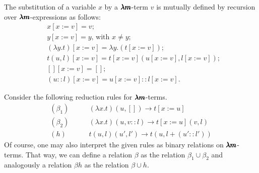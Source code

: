 \begin{definition}
  The substitution of a variable $x$ by a $\pmb{\lambda m}$-term $v$ is mutually defined by recursion over $\pmb{\lambda m}$-expressions as follows:  
  \begin{align*}
  & x[x := v] = v ; \\
  & y[x := v] = y \text{, with } x \neq y ; \\
  & (\lambda y . t)[x := v] = \lambda y . (t[x := v]) ; \\
  & t(u, l)[x := v] = t[x := v](u[x := v], l[x := v]) ; \\    
  & [][x := v] = [] ; \\
  & (u::l)[x := v] = u[x := v] :: l[x := v] .
  \end{align*}
\end{definition}


\begin{definition}
  Consider the following reduction rules for $\pmb{\lambda m}$-terms.
  \begin{align*}
    (\beta_1) & \qquad (\lambda x . t)(u, [])   \to t[x := u] \\
    (\beta_2) & \qquad (\lambda x . t)(u, v::l) \to t[x := u](v, l) \\
    (h)       & \qquad t(u, l)(u', l')          \to t(u, l + (u'::l'))
  \end{align*}
  Of course, one may also interpret the given rules as binary relations on $\pmb{\lambda m}$-terms.
  That way, we can define a relation $\beta$ as the relation $\beta_1 \cup \beta_2$ and analogously a relation $\beta h$ as the relation $\beta \cup h$.
\end{definition}


